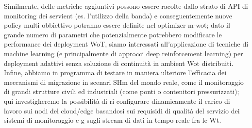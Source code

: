 \documentclass[11pt]{article}
\begin{document}
	Similmente, delle metriche aggiuntivi possono essere racolte dallo strato di API di  monitoring dei servient (es. l'utilizzo della banda) e conseguentemente nuove policy multi obbiettivo potranno essere definite nel optimizer m-wot; dato il grande numero di parametri che potenzialmente potrebbero modificare le performance dei deployment WoT, siamo interessati all'applicazione di tecniche di machine learning (e principalmente di approcci deep reinforcement learning) per deployment adattivi senza soluzione di continuità in ambient Wot distribuiti. \\
	Infine, abbiamo in programma di testare in maniera ulteriore l'efficacia dei meccanismi di migrazione in scenari SHm del mondo reale, come il monitoraggio di grandi strutture civili ed industriali (come ponti o contenitori pressurizzati); qui investigheremo la possibilità di ri configurare dinamicamente il carico di lavoro sui nodi del cloud/edge basandosi sui requisidi di qualità del servizio dei sistemi di monitoraggio e g sugli stream di dati in tempo reale fra le Wt.
	
	
\end{document}
